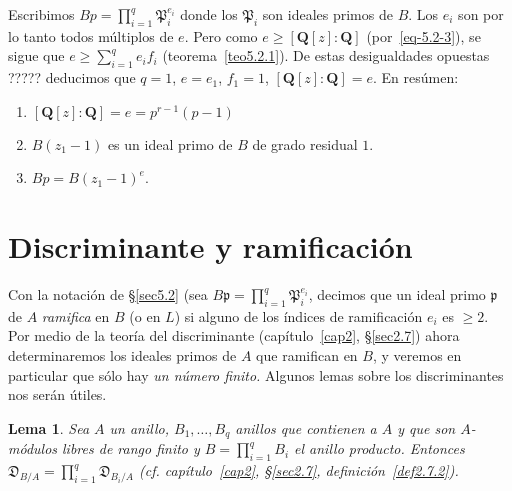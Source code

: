 \documentclass[oneside,bibtotoc,leqno,spanish]{amsbook}
\newcommand{\QQ}{\mathbf{Q}}
\newcommand{\idl}[1]{\mathfrak{#1}}
\newcommand{\disc}{\mathfrak{D}}
\numberwithin{equation}{section}
\theoremstyle{defi}
\theoremstyle{note}
\newtheorem{lemma}{Lema}
\theoremstyle{rem}
\numberwithin{theorem}{section}
\numberwithin{proposition}{section}
\numberwithin{definition}{section}
\numberwithin{lemma}{section}
\numberwithin{corollary}{section}
\numberwithin{example}{section}
\numberwithin{footnote}{section}%
\begin{document}
Escribimos $Bp = \prod_{i=1}^{q}\idl{P}_{i}^{e_{i}}$ donde los $\idl{P}_{i}$ son ideales primos de $B$. Los
$e_{i}$ son por lo tanto todos m\'ultiplos de $e$. Pero como $e\geq[\QQ[z]:\QQ]$ (por~\eqref{eq-5.2-3}), se sigue
que $e\geq \sum_{i=1}^{q}e_{i}f_{i}$ (teorema~\ref{teo5.2.1}). De estas desigualdades opuestas ????? deducimos que
$q=1$, $e=e_{1}$, $f_{1}=1$, $[\QQ[z]:\QQ]=e$. En res\'umen:
\begin{enumerate}
\item $[\QQ[z]:\QQ]=e=p^{r-1}(p-1)$
\item $B(z_{1}-1)$ es un ideal primo de $B$ de grado residual $1$.
\item $Bp = B(z_{1}-1)^{e}$.
\end{enumerate}

\section{Discriminante y ramificaci\'on}\label{sec5.3}

Con la notaci\'on de \S\ref{sec5.2} (sea $B\idl{p}=\prod_{i=1}^{q}\idl{P}_{i}^{e_{i}}$, decimos que un ideal primo
$\idl{p}$ de $A$ {\em ramifica} en $B$ (o en $L$) si alguno de los \'indices de ramificaci\'on $e_{i}$ es
$\geq 2$. Por medio de la teor\'ia del discriminante (cap\'itulo~\ref{cap2}, \S\ref{sec2.7}) ahora determinaremos los
ideales primos de $A$ que ramifican en $B$, y veremos en particular que s\'olo hay {\em un n\'umero finito.}
Algunos lemas sobre los discriminantes nos ser\'an \'utiles.

\begin{lemma}\label{lem5.3.1}
Sea $A$ un anillo, $B_{1},\dots, B_{q}$ anillos que contienen a $A$ y que son $A$-m\'odulos libres de rango finito
y $B = \prod_{i=1}^{q}B_{i}$ el anillo producto. Entonces $\disc_{B/A}=\prod_{i=1}^{q}\disc_{B_{i}/A}$
(cf. cap\'itulo~\ref{cap2}, \S\ref{sec2.7}, definici\'on~\ref{def2.7.2}).
\end{lemma}
\end{document}
